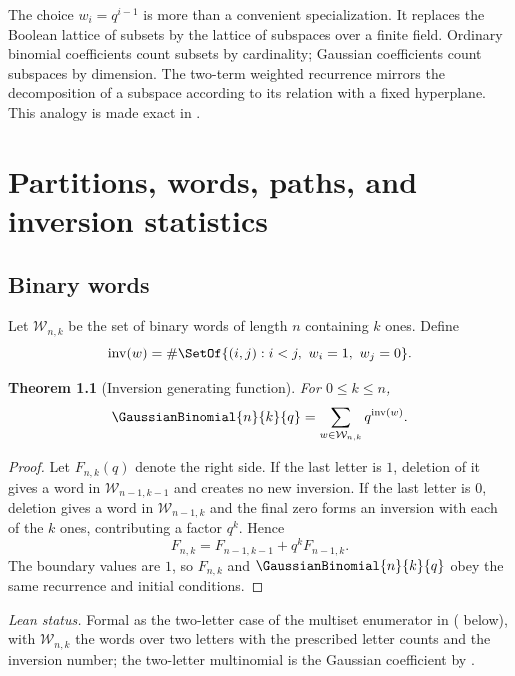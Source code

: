 \documentclass[11pt,a4paper,oneside,openany]{book}
\newtheorem{theorem}{Theorem}[chapter]
\theoremstyle{definition}
\theoremstyle{remark}
\newcommand{\InversionNumber}[1]{\operatorname{inv}(#1)}
\begin{document}
The choice $w_i=q^{i-1}$ is more than a convenient specialization.  It replaces the Boolean lattice of subsets by the lattice of subspaces over a finite field.  Ordinary binomial coefficients count subsets by cardinality; Gaussian coefficients count subspaces by dimension.  The two-term weighted recurrence mirrors the decomposition of a subspace according to its relation with a fixed hyperplane.  This analogy is made exact in .

\chapter{Partitions, words, paths, and inversion statistics}\label{chap:combinatorics}

\section{Binary words}

Let $\mathcal W_{n,k}$ be the set of binary words of length $n$ containing $k$ ones.  Define
\[
\InversionNumber{w}=\#\SetOf{(i,j):i<j,\ w_i=1,\ w_j=0}.
\]

\begin{theorem}[Inversion generating function]\label{thm:binary-inversions}
For $0\le k\le n$,
\[
\GaussianBinomial{n}{k}{q}=\sum_{w\in\mathcal W_{n,k}}q^{\InversionNumber{w}}.
\]
\end{theorem}

\begin{proof}
Let $F_{n,k}(q)$ denote the right side.  If the last letter is $1$, deletion of it gives a word in $\mathcal W_{n-1,k-1}$ and creates no new inversion.  If the last letter is $0$, deletion gives a word in $\mathcal W_{n-1,k}$ and the final zero forms an inversion with each of the $k$ ones, contributing a factor $q^k$.  Hence
\[
 F_{n,k}=F_{n-1,k-1}+q^kF_{n-1,k}.
\]
The boundary values are $1$, so $F_{n,k}$ and $\GaussianBinomial{n}{k}{q}$ obey the same recurrence and initial conditions.
\end{proof}

\emph{Lean status.}  Formal as the two-letter case of the multiset enumerator
 in 
( below), with $\mathcal W_{n,k}$ the words over two letters with
the prescribed letter counts and  the inversion number; the
two-letter multinomial is the Gaussian coefficient by .
\end{document}
